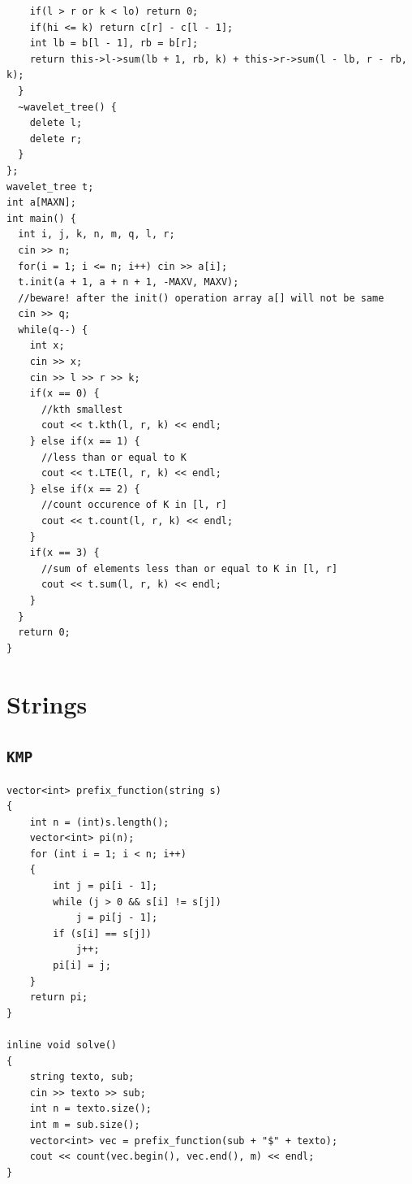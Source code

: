 \begin{lstlisting}
    if(l > r or k < lo) return 0;
    if(hi <= k) return c[r] - c[l - 1];
    int lb = b[l - 1], rb = b[r];
    return this->l->sum(lb + 1, rb, k) + this->r->sum(l - lb, r - rb, k);
  }
  ~wavelet_tree() {
    delete l;
    delete r;
  }
};
wavelet_tree t;
int a[MAXN];
int main() {
  int i, j, k, n, m, q, l, r;
  cin >> n;
  for(i = 1; i <= n; i++) cin >> a[i];
  t.init(a + 1, a + n + 1, -MAXV, MAXV);
  //beware! after the init() operation array a[] will not be same
  cin >> q;
  while(q--) {
    int x;
    cin >> x;
    cin >> l >> r >> k;
    if(x == 0) {
      //kth smallest
      cout << t.kth(l, r, k) << endl;
    } else if(x == 1) {
      //less than or equal to K
      cout << t.LTE(l, r, k) << endl;
    } else if(x == 2) {
      //count occurence of K in [l, r]
      cout << t.count(l, r, k) << endl;
    }
    if(x == 3) {
      //sum of elements less than or equal to K in [l, r]
      cout << t.sum(l, r, k) << endl;
    }
  }
  return 0;
}\end{lstlisting}

\section{Strings}

\subsection{\texttt{KMP}}
\begin{lstlisting}
vector<int> prefix_function(string s)
{
    int n = (int)s.length();
    vector<int> pi(n);
    for (int i = 1; i < n; i++)
    {
        int j = pi[i - 1];
        while (j > 0 && s[i] != s[j])
            j = pi[j - 1];
        if (s[i] == s[j])
            j++;
        pi[i] = j;
    }
    return pi;
}

inline void solve()
{
    string texto, sub;
    cin >> texto >> sub;
    int n = texto.size();
    int m = sub.size();
    vector<int> vec = prefix_function(sub + "$" + texto);
    cout << count(vec.begin(), vec.end(), m) << endl;
}\end{lstlisting}

